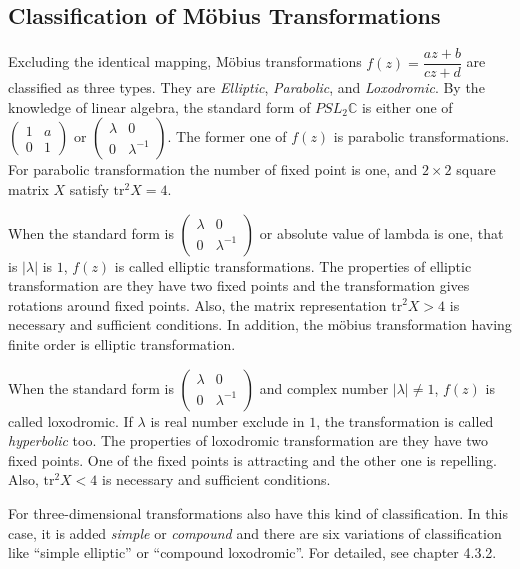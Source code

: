 \subsection{Classification of M\"obius Transformations}

Excluding the identical mapping, M\"obius transformations
$f(z) = \dfrac{az + b}{cz + d}$ are classified as three types.
They are \textit{Elliptic}, \textit{Parabolic}, and \textit{Loxodromic}.
By the knowledge of linear algebra, the standard form of $PSL_2\mathbb{C}$
is either one of $\begin{pmatrix}1 & a \\ 0 & 1 \end{pmatrix}$ or
$\begin{pmatrix}\lambda & 0 \\ 0 & \lambda^{-1} \end{pmatrix}$.
The former one of $f(z)$ is parabolic transformations.
For parabolic transformation the number of fixed point is one, and
$2 \times 2$ square matrix $X$ satisfy $\mathrm{tr}^2X = 4$.

When the standard form is
$\begin{pmatrix}\lambda & 0 \\ 0 & \lambda^{-1} \end{pmatrix}$
or absolute value of lambda is one, that is  $|\lambda|$ is $1$, 
$f(z)$ is called elliptic transformations.
The properties of elliptic transformation are they have
two fixed points and the transformation gives rotations around fixed
points.
Also, the matrix representation $\mathrm{tr}^2X > 4$ is 
necessary and sufficient conditions.
In addition, the m\"obius transformation having finite order
is elliptic transformation.

When the standard form is
$\begin{pmatrix}\lambda & 0 \\ 0 & \lambda^{-1} \end{pmatrix}$
and complex number $|\lambda| \neq 1$, $f(z)$ is called loxodromic.
If $\lambda$ is real number exclude in $1$, the transformation is called
\textit{hyperbolic} too.
The properties of loxodromic transformation are they have two fixed
points. One of the fixed points is attracting and the other one is repelling.
Also, $\mathrm{tr}^2X < 4$ is necessary and sufficient conditions.

For three-dimensional transformations also have this kind of
classification.
In this case, it is added \textit{simple} or \textit{compound} and
there are six variations of classification like ``simple elliptic'' or
``compound loxodromic''.
For detailed, see chapter 4.3.2.

